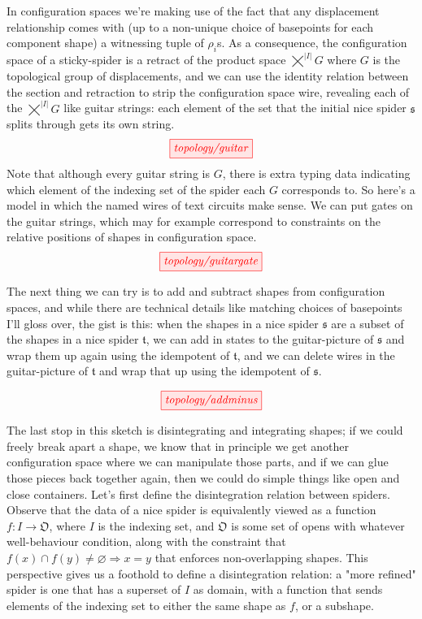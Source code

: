In configuration spaces we're making use of the fact that any displacement relationship comes with (up to a non-unique choice of basepoints for each component shape)  a witnessing tuple of $\rho_i$s. As a consequence, the configuration space of a sticky-spider is a retract of the product space $\bigtimes^{|I|} G$ where $G$ is the topological group of displacements, and we can use the identity relation between the section and retraction to strip the configuration space wire, revealing each of the $\bigtimes^{|I|} G$ like guitar strings: each element of the set that the initial nice spider $\mathfrak{s}$ splits through gets its own string.
\[\tikzfig{topology/guitar}\]
Note that although every guitar string is $G$, there is extra typing data indicating which element of the indexing set of the spider each $G$ corresponds to. So here's a model in which the named wires of text circuits make sense. We can put gates on the guitar strings, which may for example correspond to constraints on the relative positions of shapes in configuration space.
\[\tikzfig{topology/guitargate}\]

The next thing we can try is to add and subtract shapes from configuration spaces, and while there are technical details like matching choices of basepoints I'll gloss over, the gist is this: when the shapes in a nice spider $\mathfrak{s}$ are a subset of the shapes in a nice spider $\mathfrak{t}$, we can add in states to the guitar-picture of $\mathfrak{s}$ and wrap them up again using the idempotent of $\mathfrak{t}$, and we can delete wires in the guitar-picture of $\mathfrak{t}$ and wrap that up using the idempotent of $\mathfrak{s}$.

\[\tikzfig{topology/addminus}\]

The last stop in this sketch is disintegrating and integrating shapes; if we could freely break apart a shape, we know that in principle we get another configuration space where we can manipulate those parts, and if we can glue those pieces back together again, then we could do simple things like open and close containers. Let's first define the disintegration relation between spiders. Observe that the data of a nice spider is equivalently viewed as a function $f: I \rightarrow \mathfrak{O}$, where $I$ is the indexing set, and $\mathfrak{O}$ is some set of opens with whatever well-behaviour condition, along with the constraint that $f(x) \cap f(y) \neq \varnothing \Rightarrow x = y$ that enforces non-overlapping shapes. This perspective gives us a foothold to define a disintegration relation: a "more refined" spider is one that has a superset of $I$ as domain, with a function that sends elements of the indexing set to either the same shape as $f$, or a subshape.

